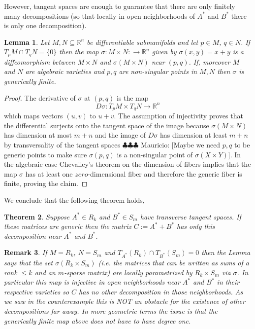 \documentclass[12pt]{amsart}
\newtheorem{lemma}{Lemma}[section]
\newtheorem{theorem}[lemma]{Theorem}
\newtheorem{remark}[lemma]{Remark}
\numberwithin{equation}{section}
\newcommand{\RR}{\mathbb{R}}
\newcommand{\mv}[1]{{\color{red} \sf $\clubsuit\clubsuit\clubsuit$ Mauricio: [#1]}}
\begin{document}
However, tangent spaces are enough to guarantee that there are only finitely many decompositions (so that locally in open neighborhoods of $A^*$ and $B^*$ there is only one decomposition).

\begin{lemma} Let $M,N\subseteq \RR^n$ be differentiable submanifolds and let $p\in M$, $q\in N$. If $T_pM\cap T_qN=\{0\}$ then the map $\sigma: M\times N:\rightarrow \RR^n$ given by $\sigma(x,y)=x+y$ is a diffeomorphism between $M\times N$ and $\sigma(M\times N)$ near $(p,q)$. If, moreover $M$ and $N$ are algebraic varieties and $p,q$ are non-singular points in $M,N$ then $\sigma$ is generically finite. 
\end{lemma}
\begin{proof} The derivative of $\sigma$ at $(p,q)$ is the map
\[D\sigma: T_pM\times T_qN\rightarrow \RR^n\]
which maps vectors $(u,v)$ to $u+v$. The assumption of injectivity proves that the differential surjects onto the tangent space of the image because $\sigma(M\times N)$ has dimension at most $m+n$ and the image of $D\sigma$ has dimension at least $m+n$ by transversality of the tangent spaces \mv{Maybe we need $p,q$ to be generic points to make sure $\sigma(p,q)$ is a non-singular point of $\sigma(X\times Y)$}. In the algebraic case Chevalley's theorem on the dimension of fibers implies that the map $\sigma$ has at least one $zero$-dimensional fiber and therefore the generic fiber is finite, proving the claim.
\end{proof}

We conclude that the following theorem holds,

\begin{theorem} Suppose $A^*\in R_k$ and $B^*\in S_m$ have transverse tangent spaces. If these matrices are generic then the matrix $C:=A^*+B^*$ has only this decomposition near $A^*$ and $B^*$.
\end{theorem}


\begin{remark} If $M=R_k$, $N=S_m$ and $T_{A^*}(R_k)\cap T_{B^*}(S_m)=0$ then the Lemma says that the set $\sigma(R_k\times S_m)$ (i.e. the matrices that can be written as sums of a rank $\leq k$ and an $m$-sparse matrix) are locally parametrized by $R_k\times S_m$ via $\sigma$. In particular this map is injective in open neighborhoods near $A^*$ and $B^*$ in their respective varieties so $C$ has no other decomposition {\it in those neighborhoods}. As we saw in the counterexample this is NOT an obstacle for the existence of other decompositions far away. In more geometric terms the issue is that the generically finite map above does not have to have degree one.   
\end{remark}
\newpage
\end{document}
